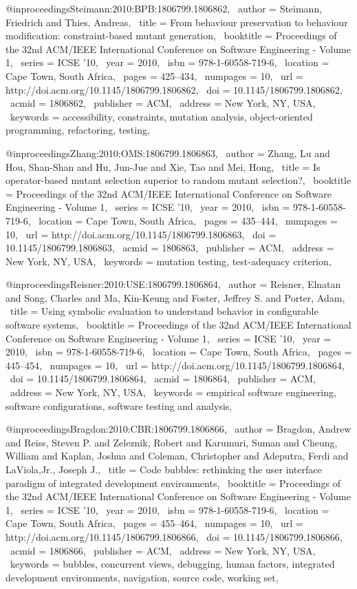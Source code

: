 @inproceedings{Steimann:2010:BPB:1806799.1806862,
 author = {Steimann, Friedrich and Thies, Andreas},
 title = {From behaviour preservation to behaviour modification: constraint-based mutant generation},
 booktitle = {Proceedings of the 32nd ACM/IEEE International Conference on Software Engineering - Volume 1},
 series = {ICSE '10},
 year = {2010},
 isbn = {978-1-60558-719-6},
 location = {Cape Town, South Africa},
 pages = {425--434},
 numpages = {10},
 url = {http://doi.acm.org/10.1145/1806799.1806862},
 doi = {10.1145/1806799.1806862},
 acmid = {1806862},
 publisher = {ACM},
 address = {New York, NY, USA},
 keywords = {accessibility, constraints, mutation analysis, object-oriented programming, refactoring, testing},
} 

@inproceedings{Zhang:2010:OMS:1806799.1806863,
 author = {Zhang, Lu and Hou, Shan-Shan and Hu, Jun-Jue and Xie, Tao and Mei, Hong},
 title = {Is operator-based mutant selection superior to random mutant selection?},
 booktitle = {Proceedings of the 32nd ACM/IEEE International Conference on Software Engineering - Volume 1},
 series = {ICSE '10},
 year = {2010},
 isbn = {978-1-60558-719-6},
 location = {Cape Town, South Africa},
 pages = {435--444},
 numpages = {10},
 url = {http://doi.acm.org/10.1145/1806799.1806863},
 doi = {10.1145/1806799.1806863},
 acmid = {1806863},
 publisher = {ACM},
 address = {New York, NY, USA},
 keywords = {mutation testing, test-adequacy criterion},
} 

@inproceedings{Reisner:2010:USE:1806799.1806864,
 author = {Reisner, Elnatan and Song, Charles and Ma, Kin-Keung and Foster, Jeffrey S. and Porter, Adam},
 title = {Using symbolic evaluation to understand behavior in configurable software systems},
 booktitle = {Proceedings of the 32nd ACM/IEEE International Conference on Software Engineering - Volume 1},
 series = {ICSE '10},
 year = {2010},
 isbn = {978-1-60558-719-6},
 location = {Cape Town, South Africa},
 pages = {445--454},
 numpages = {10},
 url = {http://doi.acm.org/10.1145/1806799.1806864},
 doi = {10.1145/1806799.1806864},
 acmid = {1806864},
 publisher = {ACM},
 address = {New York, NY, USA},
 keywords = {empirical software engineering, software configurations, software testing and analysis},
} 

@inproceedings{Bragdon:2010:CBR:1806799.1806866,
 author = {Bragdon, Andrew and Reiss, Steven P. and Zeleznik, Robert and Karumuri, Suman and Cheung, William and Kaplan, Joshua and Coleman, Christopher and Adeputra, Ferdi and LaViola,Jr., Joseph J.},
 title = {Code bubbles: rethinking the user interface paradigm of integrated development environments},
 booktitle = {Proceedings of the 32nd ACM/IEEE International Conference on Software Engineering - Volume 1},
 series = {ICSE '10},
 year = {2010},
 isbn = {978-1-60558-719-6},
 location = {Cape Town, South Africa},
 pages = {455--464},
 numpages = {10},
 url = {http://doi.acm.org/10.1145/1806799.1806866},
 doi = {10.1145/1806799.1806866},
 acmid = {1806866},
 publisher = {ACM},
 address = {New York, NY, USA},
 keywords = {bubbles, concurrent views, debugging, human factors, integrated development environments, navigation, source code, working set},
} 

